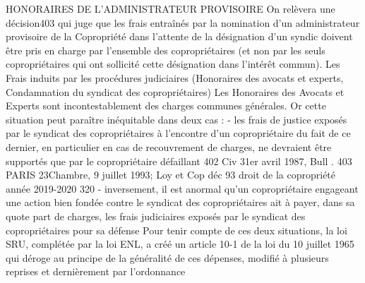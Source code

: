 		HONORAIRES DE L’ADMINISTRATEUR PROVISOIRE
		On relèvera une décision403 qui juge que les frais entraînés par la nomination d'un administrateur provisoire de la Copropriété dans l'attente de la désignation d'un syndic doivent être pris en charge par l'ensemble des copropriétaires (et non par les seuls copropriétaires qui ont sollicité cette désignation dans l'intérêt commun).
		Les Frais induits par les procédures judiciaires (Honoraires des avocats et experts, Condamnation du syndicat des copropriétaires)
		Les Honoraires des Avocats et Experts sont incontestablement des charges communes générales. Or cette situation peut paraître inéquitable dans deux cas :
		- les frais de justice exposés par le syndicat des copropriétaires à l’encontre d’un copropriétaire du fait de ce dernier, en particulier en cas de recouvrement de charges, ne devraient être supportés que par le copropriétaire défaillant
		402 Civ 3\degres 1er avril 1987, Bull .
		403 PARIS 23\degres Chambre, 9 juillet 1993; Loy et Cop déc 93 
		droit de la copropriété année 2019-2020
		320
		- inversement, il est anormal qu’un copropriétaire engageant une action bien fondée contre le syndicat des copropriétaires ait à payer, dans sa quote part de charges, les frais judiciaires exposés par le syndicat des copropriétaires pour sa défense
		Pour tenir compte de ces deux situations, la loi SRU, complétée par la loi ENL, a créé un article 10-1 de la loi du 10 juillet 1965 qui déroge au principe de la généralité de ces dépenses, modifié à plusieurs reprises et dernièrement par l’ordonnance
